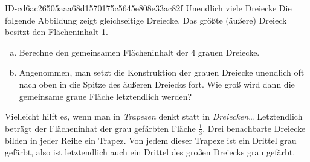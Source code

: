 \begin{exercise}
      {ID-cd6ac26505aaa68d1570175c5645e808e33ac82f}
      {Unendlich viele Dreiecke}
  \newcommand{\topdowntriangle}[3]
  {%
    \filldraw[fill=black!40!white] (#1, #2) -- ++(60:#3) -- ++(180:#3) -- cycle;
  }%
  \ifproblem\problem
    Die folgende Abbildung zeigt gleichseitige Dreiecke. Das größte (äußere) Dreieck
    besitzt den Flächeninhalt 1.
    \begin{center}
    \end{center}
    \begin{enumerate}[a)]
      \item Berechne den gemeinsamen Flächeninhalt der 4 grauen Dreiecke.
      \item Angenommen, man setzt die Konstruktion der grauen Dreiecke
            unendlich oft nach oben in die Spitze des äußeren Dreiecks fort.
            Wie groß wird dann die gemeinsame graue Fläche letztendlich werden?
    \end{enumerate}
  \fi
  \ifoutline\outline
    Vielleicht hilft es, wenn man in \textit{Trapezen} denkt statt in \textit{Dreiecken}\ldots
  \fi
  \ifoutcome\outcome
    Letztendlich beträgt der Flächeninhat der grau gefärbten Fläche $\frac{1}{3}$.
    Drei benachbarte Dreiecke bilden in jeder \glqq Reihe\grqq{} ein Trapez.
    Von jedem dieser Trapeze ist ein Drittel grau gefärbt, also ist letztendlich
    auch ein Drittel des großen Dreiecks grau gefärbt.
  \fi
\end{exercise}

%

